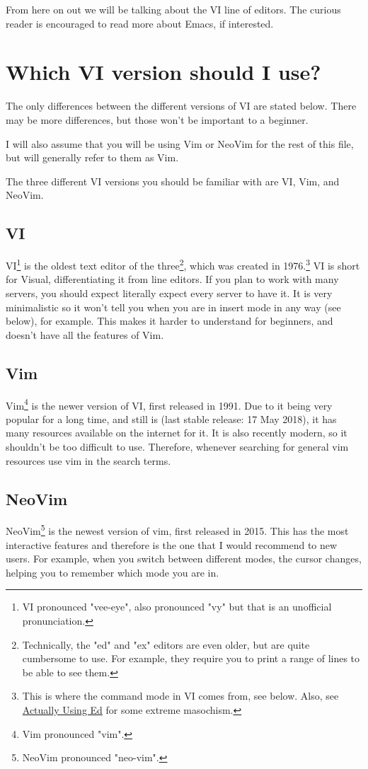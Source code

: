 \documentclass[11pt]{article}
\begin{document}
From here on out we will be talking about the VI line of editors. The curious
reader is encouraged to read more about Emacs, if interested.
\section{Which VI version should I use?}
\label{sec:org322ed02}
The only differences between the different versions of VI are stated below.
There may be more differences, but those won't be important to a beginner.

I will also assume that you will be using Vim or NeoVim for the rest of this
file, but will generally refer to them as Vim.

The three different VI versions you should be familiar with are VI, Vim, 
and NeoVim.
\subsection{VI}
\label{sec:org2e3cb26}
VI\footnote{VI pronounced "vee-eye", also pronounced "vy" but that is an
unofficial pronunciation.} is the oldest text editor of the three\footnote{Technically, the "ed" and "ex" editors are even older, but are 
quite cumbersome to use. For example, they require you to print a range
of lines to be able to see them.}, which was created in
1976.\footnote{This is where the command mode in VI comes from, see below. 
Also, see \href{https://sanctum.geek.nz/arabesque/actually-using-ed/}{Actually Using Ed} for some extreme masochism.} VI is short for Visual, differentiating it from line editors. If
you plan to work with many servers, you should expect literally expect every
server to have it. It is very minimalistic so it won't tell you when you are in
insert mode in any way (see below), for example. This makes it harder to
understand for beginners, and doesn't have all the features of Vim.
\subsection{Vim}
\label{sec:org2a7769a}
Vim\footnote{Vim pronounced "vim".} is the newer version of VI, first released in 1991. Due to it being
very popular for a long time, and still is (last stable release: 17 May 2018),
it has many resources available on the internet for it. It is also recently
modern, so it shouldn't be too difficult to use. Therefore, whenever searching
for general vim resources use vim in the search terms.
\subsection{NeoVim}
\label{sec:org8a52d39}
NeoVim\footnote{NeoVim pronounced "neo-vim".} is the newest version of vim, first released in 2015. This has the
most interactive features and therefore is the one that I would recommend to new
users. For example, when you switch between different modes, the cursor changes,
helping you to remember which mode you are in.
\end{document}
